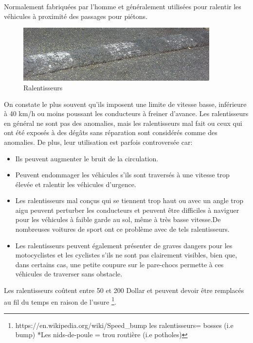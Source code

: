 Normalement fabriquées par l'homme et généralement utilisées pour ralentir les véhicules à proximité des passages pour piétons.
\begin{figure}[h!]
    \center
    \includegraphics[width=0.9\textwidth]{Images/chapter1/Speedbump.jpg}
    \caption{Ralentisseurs}
    \end{figure}
    On constate le plus souvent qu’ils imposent une limite de vitesse basse, inférieure à 40 km/h ou moins poussant les conducteurs à freiner d’avance.
    Les ralentisseurs en général ne sont pas des anomalies, mais les ralentisseurs mal fait ou ceux qui ont été exposés à des dégâts sans réparation sont considérés comme des anomalies.  
    De plus, leur utilisation est parfois controversée car:
  \renewcommand{\labelitemi}{$\bullet$}
  \begin{itemize}
    \item Ils peuvent augmenter le bruit de la circulation.
    \item Peuvent endommager les véhicules s'ils sont traversés à une vitesse trop élevée et ralentir les véhicules d'urgence.
    \item Les ralentisseurs mal conçus qui se tiennent trop haut ou avec un angle
      trop aigu peuvent perturber les conducteurs et peuvent être difficiles à naviguer pour les véhicules à faible garde au sol,
      même à très basse vitesse.De nombreuses voitures de sport ont ce problème avec de tels ralentisseurs. 
    \item Les ralentisseurs peuvent également présenter de graves dangers pour les motocyclistes et les cyclistes s'ils ne sont pas
    clairement visibles, bien que, dans certains cas, une petite coupure sur le pare-chocs permette à ces véhicules de
     traverser sans obstacle.
  \end{itemize}

  Les ralentisseurs coûtent entre 50 et 200 Dollar et peuvent devoir être remplacés au fil du temps 
   en raison de l'usure 
   \footnote{https://en.wikipedia.org/wiki/Speed\_bump \newline *les ralentisseurs= bosses (i.e bump) *Les nids-de-poule = trou routière (i.e potholes)}. 

